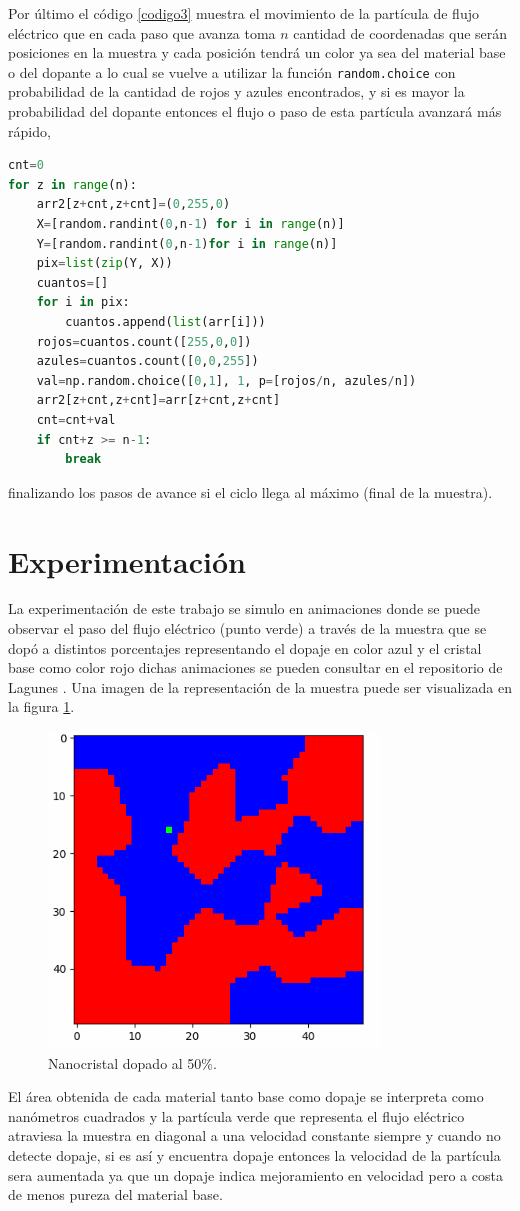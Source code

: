 \documentclass[9pt,twocolumn,twoside]{osajnl}
\begin{document}
Por último el código \ref{codigo3} muestra el movimiento de la partícula de flujo eléctrico que en cada paso que avanza toma $n$ cantidad de coordenadas que serán posiciones en la muestra y cada posición tendrá un color ya sea del material base o del dopante a lo cual se vuelve a utilizar la función \texttt{random.choice} con probabilidad de la cantidad de rojos y azules encontrados, y si es mayor la probabilidad del dopante entonces el flujo o paso de esta partícula avanzará más rápido,
\begin{lstlisting}[language=Python,caption=Método para acelerar flujo eléctrico., label=codigo3] 
cnt=0
for z in range(n): 
    arr2[z+cnt,z+cnt]=(0,255,0)
    X=[random.randint(0,n-1) for i in range(n)]
    Y=[random.randint(0,n-1)for i in range(n)]
    pix=list(zip(Y, X))
    cuantos=[]
    for i in pix:
        cuantos.append(list(arr[i]))
    rojos=cuantos.count([255,0,0])
    azules=cuantos.count([0,0,255])    
    val=np.random.choice([0,1], 1, p=[rojos/n, azules/n]) 
    arr2[z+cnt,z+cnt]=arr[z+cnt,z+cnt]
    cnt=cnt+val
    if cnt+z >= n-1:
        break
\end{lstlisting}
finalizando los pasos de avance si el ciclo llega al máximo (final de la muestra).
\section{Experimentación}
La experimentación de este trabajo se simulo en animaciones donde se puede observar el paso del flujo eléctrico (punto verde) a través de la muestra que se dopó a distintos porcentajes representando el dopaje en color azul y el cristal base como color rojo dichas animaciones se pueden consultar en el repositorio de Lagunes \cite{raul}. Una imagen de la representación de la muestra puede ser visualizada en la figura \ref{dopaje}. 
\begin{figure}[h]
    \centering
    \includegraphics[scale=.75]{dopaje_50.png}
    \caption{Nanocristal dopado al 50\%.}
    \label{dopaje}
\end{figure}
El área obtenida de cada material tanto base como dopaje se interpreta como nanómetros cuadrados y la partícula verde que representa el flujo eléctrico atraviesa la muestra en diagonal a una velocidad constante siempre y cuando no detecte dopaje, si es así y encuentra dopaje entonces la velocidad de la partícula sera aumentada ya que un dopaje indica mejoramiento en velocidad pero a costa de menos pureza del material base.
\end{document}
